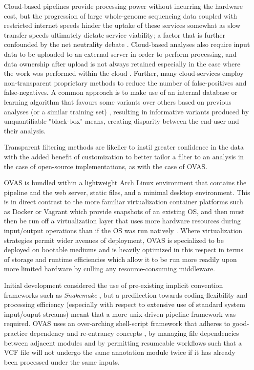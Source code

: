 \documentclass[twocolumn]{bmcart}%
\def\app{OVAS}
\newcommand{\changes}[1]{{\color{red} #1}}
\begin{document}
\changes{Cloud-based pipelines provide processing power without incurring the hardware cost, but the progression of large whole-genome sequencing data coupled with restricted internet speeds hinder the uptake of these services somewhat as slow transfer speeds ultimately dictate service viability; a factor that is further confounded by the net neutrality debate \cite{netneutrality}.} Cloud-based analyses also require input data to be uploaded to an external server in order to perform processing, and data ownership after upload is not always retained especially in the case where the work was performed within the cloud \cite{reed2010information}. Further, many cloud-services employ non-transparent proprietary methods to reduce the number of false-positives and false-negatives. A common approach is to make use of an internal database or learning algorithm that favours some variants over others based on previous analyses (or a similar training set) \cite{pabinger2014survey}, resulting in informative variants produced by unquantifiable "black-box" means, creating disparity between the end-user and their analysis.

Transparent filtering methods are likelier to instil greater confidence in the data with the added benefit of customization to better tailor a filter to an analysis in the case of open-source implementations, as with the case of \app{}.


\changes{
\app{} is bundled within a lightweight Arch Linux environment that contains the pipeline and the web server, static files, and a minimal desktop environment. 
This is in direct contrast to the more familiar virtualization container platforms such as Docker or Vagrant which provide snapshots of an existing OS, and then must then be run off a virtualization layer that uses more hardware resources during input/output operations than if the OS was run natively \cite{virtualcomparison}. Where virtualization strategies permit wider avenues of deployment, \app{} is specialized to be deployed on bootable mediums and is heavily optimized in this respect in terms of storage and runtime efficiencies which allow it to be run more readily upon more limited hardware by culling any resource-consuming middleware.
}


\changes{Initial development considered the use of pre-existing implicit convention frameworks such as \textit{Snakemake} \cite{koster2012snakemake}, but a predilection towards coding-flexibility and processing efficiency (especially with respect to extensive use of standard system input/ouput streams) meant that a more unix-driven pipeline framework was required. \app{} uses an over-arching shell-script framework that adheres to good-practice dependency and re-entrancy concepts \cite{leipzigreview}, by managing file dependencies between adjacent modules and by permitting resumeable workflows such that a VCF file will not undergo the same annotation module twice if it has already been processed under the same inputs.}
\end{document}
